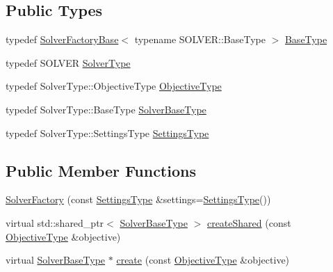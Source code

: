 \subsection*{Public Types}
\begin{DoxyCompactItemize}
\item 
typedef \hyperlink{classnifty_1_1graph_1_1opt_1_1common_1_1SolverFactoryBase}{Solver\+Factory\+Base}$<$ typename S\+O\+L\+V\+E\+R\+::\+Base\+Type $>$ \hyperlink{classnifty_1_1graph_1_1opt_1_1common_1_1SolverFactory_a1ee462d5a3bfe33e029bbe19e92c7684}{Base\+Type}
\item 
typedef S\+O\+L\+V\+ER \hyperlink{classnifty_1_1graph_1_1opt_1_1common_1_1SolverFactory_a26ff0b82a74762acc2d96f4304beff2f}{Solver\+Type}
\item 
typedef Solver\+Type\+::\+Objective\+Type \hyperlink{classnifty_1_1graph_1_1opt_1_1common_1_1SolverFactory_a4ef9d5764ef3966d6610408b90446dbc}{Objective\+Type}
\item 
typedef Solver\+Type\+::\+Base\+Type \hyperlink{classnifty_1_1graph_1_1opt_1_1common_1_1SolverFactory_ad87bdd3c823b312882825dbb58afdf93}{Solver\+Base\+Type}
\item 
typedef Solver\+Type\+::\+Settings\+Type \hyperlink{classnifty_1_1graph_1_1opt_1_1common_1_1SolverFactory_a446fddb741fd543837d9dc8e04ecb10e}{Settings\+Type}
\end{DoxyCompactItemize}
\subsection*{Public Member Functions}
\begin{DoxyCompactItemize}
\item 
\hyperlink{classnifty_1_1graph_1_1opt_1_1common_1_1SolverFactory_a244c7fbacf20d01edf4c9cdd9f363700}{Solver\+Factory} (const \hyperlink{classnifty_1_1graph_1_1opt_1_1common_1_1SolverFactory_a446fddb741fd543837d9dc8e04ecb10e}{Settings\+Type} \&settings=\hyperlink{classnifty_1_1graph_1_1opt_1_1common_1_1SolverFactory_a446fddb741fd543837d9dc8e04ecb10e}{Settings\+Type}())
\item 
virtual std\+::shared\+\_\+ptr$<$ \hyperlink{classnifty_1_1graph_1_1opt_1_1common_1_1SolverFactory_ad87bdd3c823b312882825dbb58afdf93}{Solver\+Base\+Type} $>$ \hyperlink{classnifty_1_1graph_1_1opt_1_1common_1_1SolverFactory_ab49dca66d82adac8acc5b71fd218ce8f}{create\+Shared} (const \hyperlink{classnifty_1_1graph_1_1opt_1_1common_1_1SolverFactory_a4ef9d5764ef3966d6610408b90446dbc}{Objective\+Type} \&objective)
\item 
virtual \hyperlink{classnifty_1_1graph_1_1opt_1_1common_1_1SolverFactory_ad87bdd3c823b312882825dbb58afdf93}{Solver\+Base\+Type} $\ast$ \hyperlink{classnifty_1_1graph_1_1opt_1_1common_1_1SolverFactory_a6183e1800d9d7c82de7cac0b5297a42f}{create} (const \hyperlink{classnifty_1_1graph_1_1opt_1_1common_1_1SolverFactory_a4ef9d5764ef3966d6610408b90446dbc}{Objective\+Type} \&objective)
\end{DoxyCompactItemize}


